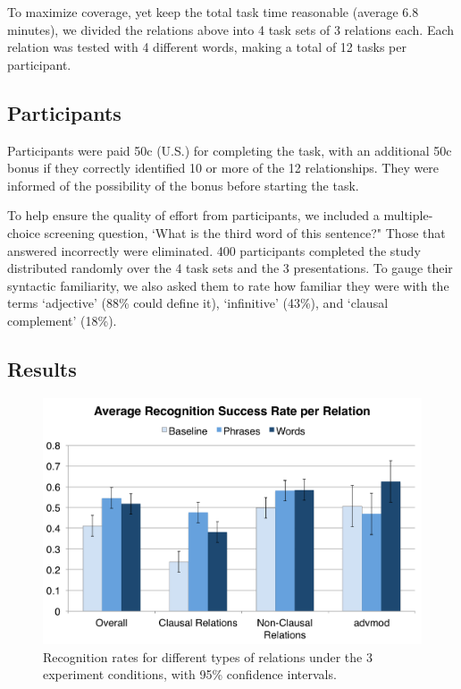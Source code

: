 To maximize coverage, yet keep the total task time reasonable (average 6.8 minutes), we divided the relations above into 4 task sets of 3 relations each. Each relation was tested with 4 different words, making a total of 12 tasks per participant.

\subsection{Participants}
Participants were paid 50c (U.S.) for completing the task, with an additional 50c bonus if they correctly identified 10 or more of the 12 relationships. They were informed of the possibility of the bonus before starting the task.

To help ensure the quality of effort from participants, we included a multiple-choice screening question, `What is the third word of this sentence?"  Those that answered incorrectly were eliminated. 400 participants completed the study distributed randomly over the 4 task sets and the 3 presentations. To gauge their syntactic familiarity, we also asked them to rate how familiar they were with the terms `adjective' (88\% could define it), `infinitive' (43\%), and `clausal complement' (18\%).

\subsection{Results}
\begin{figure}
\centering
\includegraphics[width=\columnwidth]{fig/results}
\caption{\label{fig:results} Recognition rates for different types of relations under the 3 experiment conditions, with 95\% confidence intervals.}
\end{figure}

